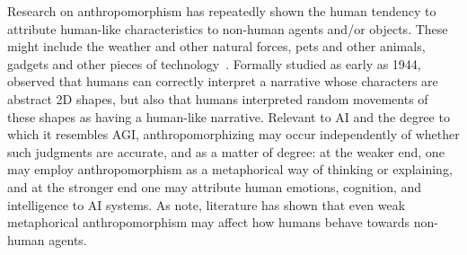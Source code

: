 \documentclass{article}
\theoremstyle{plain}
\theoremstyle{definition}
\theoremstyle{remark}
\begin{document}
Research on anthropomorphism has repeatedly shown the human tendency to attribute human-like characteristics to non-human agents and/or objects. These might include the weather and other natural forces, pets and other animals, gadgets and other pieces of technology~\cite{epley2007seeing}. Formally studied as early as 1944,~\cite{heider1944experimental} observed that humans can correctly interpret a narrative whose characters are abstract 2D shapes, but also that humans interpreted random movements of these shapes as having a human-like narrative. 
Relevant to AI and the degree to which it resembles AGI, anthropomorphizing may occur independently of whether such judgments are accurate, and as a matter of degree: at the weaker end, one may employ anthropomorphism as a metaphorical way of thinking or explaining, and at the stronger end one may attribute human emotions, cognition, and intelligence to AI systems. As \citet{epley2007seeing} note, literature has shown that even weak metaphorical anthropomorphism may affect how humans behave towards non-human agents.
\end{document}
